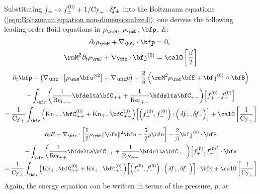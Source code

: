     \line

    Substituting $f_{\pm}  \mapsto  f_{\pm}^{(0)} + 1/\mathrm{Cy}_{+}\cdot\delta\!f_{\pm}$ into the Boltzmann equations (\ref{eqn:Boltzmann equation non-dimensionalized}), one derives the following leading-order fluid equations in $\rho_{\rmM}$, $\rho_{\rmC}$, $\bfp$, $E$:
    \begin{align}
        \partial_{t}\rho_{\rmM} + \nabla_{\bfx}\cdot\bfp  &=  0,  \label{eqn:PiC-coupled mass conservation}  \\
        \rmM^{2}\partial_{t}\rho_{\rmC} + \nabla_{\bfx}\cdot\bfj^{(0)}  &=  \calO\left[\frac{\beta}{2}\right]  \label{eqn:PiC-coupled charge conservation}
    \end{align}
    \vspace{-20pt}
    \begin{multline}
        \partial_{t}\bfp + \left(\nabla_{\bfx}\cdot\left[\rho_{\rmM}\bfu^{\otimes 2}\right] + \nabla_{\bfx}p\right) - \frac{2}{\beta}\left(\rmM^{2}\rho_{\rmC}\bfE + \bfj^{(0)}\wedge\bfB\right) \\
        - \int_{\bfv}\left(\frac{1}{{\rmRef}_{++}}\bfdelta\bfC_{++} + \frac{1}{{\rmRef}_{+-}}\bfdelta\bfC_{+-}\right)\!\left[f_{+}^{(0)}, f_{-}^{(0)}\right]  \\
        =  \frac{1}{\rmCy_{+}}\int_{\bfv}\left(\rmKn_{++}\bfC_{++}^{(0)} + \rmKn_{+-}\bfC_{+-}^{(0)}\right)\!\left[\left(f_{+}^{(0)}, f_{-}^{(0)}\right); \left({\color{white} f_{+}^{(0)}}\!\!\!\!\!\!\!\!\!\delta\!f_{+}, \delta\!f_{-}\right)\right] + \calO\left[\frac{1}{\rmCy_{+}}\right]
    \end{multline}
    \vspace{-20pt}
    \begin{multline}
        \partial_{t}E + \nabla_{\bfx}\cdot\left[\frac{1}{2}\rho_{\rmM}\|\bfu\|^{2}\bfu + \frac{5}{2}p\bfu\right] - \frac{2}{\beta}\bfj^{(0)}\cdot\bfE  \\
        - \int_{\bfv}\left(\frac{1}{{\rmRef}_{++}}\bfdelta\bfC_{++} + \frac{1}{{\rmRef}_{+-}}\bfdelta\bfC_{+-}\right)\!\left[f_{+}^{(0)}, f_{-}^{(0)}\right]\cdot\bfv  \\
        =  \frac{1}{\rmCy_{+}}\int_{\bfv}\left(\rmKn_{++}\bfC_{++}^{(0)} + \rmKn_{+-}\bfC_{+-}^{(0)}\right)\!\left[\left(f_{+}^{(0)}, f_{-}^{(0)}\right); \left({\color{white} f_{+}^{(0)}}\!\!\!\!\!\!\!\!\!\delta\!f_{+}, \delta\!f_{-}\right)\right]\cdot\bfv + \calO\left[\frac{1}{\rmCy_{+}}\right]
    \end{multline}
    Again, the energy equation can be written in terms of the pressure, $p$, as
